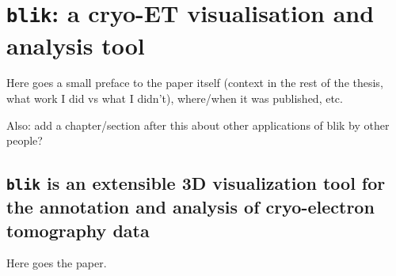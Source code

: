 \chapter{\texttt{blik}: a cryo-ET visualisation and analysis tool}

Here goes a small preface to the paper itself (context in the rest of the thesis, what work I did vs what I didn't), where/when it was published, etc.

Also: add a chapter/section after this about other applications of blik by other people?

\section*{\texttt{blik} is an extensible 3D visualization tool for the annotation and analysis of cryo-electron tomography data}


Here goes the paper.

% 
